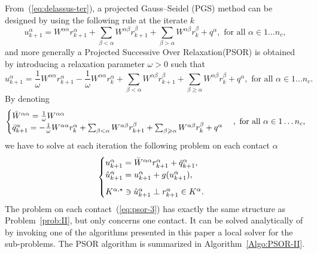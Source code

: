 From~(\ref{eq:delassus-ter}), a projected Gauss--Seidel (PGS) method can be designed by using the following rule at the iterate $k$
\begin{equation}
  \label{eq:pgs-1}
  u^{\alpha}_{k+1} = W^{\alpha\alpha} r^{\alpha}_{k+1} + \sum_{\beta < \alpha}W^{\alpha\beta} r^{\beta}_{k+1} + \sum_{\beta > \alpha}W^{\alpha\beta} r^{\beta}_{k} +  q^\alpha, \text{ for all } \alpha \in 1\ldots n_c,
\end{equation}
and more generally a Projected Successive Over Relaxation(PSOR) is obtained by introducing a relaxation parameter $\omega>0$ such that
\begin{equation}
  \label{eq:psor-1}
  u^{\alpha}_{k+1} = \frac 1 \omega W^{\alpha\alpha} r^{\alpha}_{k+1} 
  - \frac 1 \omega W^{\alpha\alpha} r^{\alpha}_{k} +
  \sum_{\beta < \alpha}W^{\alpha\beta} r^{\beta}_{k+1} + \sum_{\beta \geq \alpha}W^{\alpha\beta} r^{\beta}_{k} +  q^\alpha, \text{ for all } \alpha \in 1\ldots n_c.
\end{equation}
By denoting 
\begin{equation}
  \label{eq:psor-2}
  \begin{cases}
    \Bar W^{\alpha\alpha} = \frac 1 \omega W^{\alpha\alpha} \\
    \bar q^{\alpha}_{k+1} = - \frac 1 \omega W^{\alpha\alpha} r^{\alpha}_{k}
    + \sum_{\beta < \alpha}W^{\alpha\beta} r^{\beta}_{k+1} + \sum_{\beta
      \geq \alpha}W^{\alpha\beta} r^{\beta}_{k} + q^\alpha
  \end{cases}
, \text{ for all } \alpha \in 1\ldots n_c,
\end{equation}
we have to solve at each iteration the following problem on each contact $\alpha$
\begin{equation}\label{eq:psor-3}
  \begin{cases}
    u^{\alpha}_{k+1} =  \Bar W^{\alpha\alpha}  r^{\alpha}_{k+1} + \bar q^{\alpha}_{k+1}, \\
    \hat u^{\alpha}_{k+1} =u^{\alpha}_{k+1} + g(u^{\alpha}_{k+1}), \\[2mm]
    K^{\alpha,\star} \ni {\hat u^{\alpha}_{k+1}} \perp r^{\alpha}_{k+1} \in K^\alpha.
  \end{cases}
\end{equation}
The problem on each contact~(\ref{eq:psor-3}) has exactly the same structure as Problem~\ref{prob:II}, but only concerns one contact. It can be solved analytically of by invoking one of the algorithms presented in this paper a local solver for the sub-problems. The PSOR algorithm is summarized in Algorithm~\ref{Algo:PSOR-II}.

